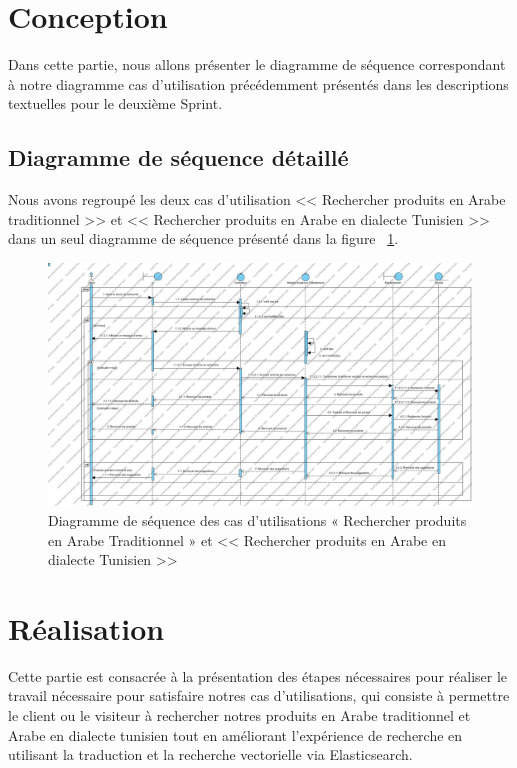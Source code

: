 \section{Conception}
\noindent
Dans cette partie, nous allons présenter le diagramme de séquence correspondant à notre diagramme cas d'utilisation précédemment présentés dans les descriptions textuelles pour le deuxième Sprint.

\subsection{Diagramme de séquence détaillé}
\noindent
Nous avons regroupé les deux cas d'utilisation << Rechercher produits en Arabe traditionnel >> et << Rechercher produits en Arabe en dialecte Tunisien >> dans un seul diagramme de séquence présenté dans la figure ~\ref{fig:diagseqsprint2}.

\begin{figure}[H]
	\centering
	\includegraphics[width=1\textwidth]{logos/seqsprint2.png}
	\caption{Diagramme de séquence des cas d’utilisations « Rechercher produits en Arabe Traditionnel » et << Rechercher produits en Arabe en dialecte Tunisien >>}
	\label{fig:diagseqsprint2}
\end{figure}

\section{Réalisation}
\noindent
Cette partie est consacrée à la présentation des étapes nécessaires pour réaliser le travail nécessaire pour satisfaire notres cas d'utilisations, qui consiste à permettre le client ou le visiteur à rechercher notres produits en Arabe traditionnel et Arabe en dialecte tunisien tout en améliorant l'expérience de recherche en utilisant la traduction et la recherche vectorielle via Elasticsearch.

